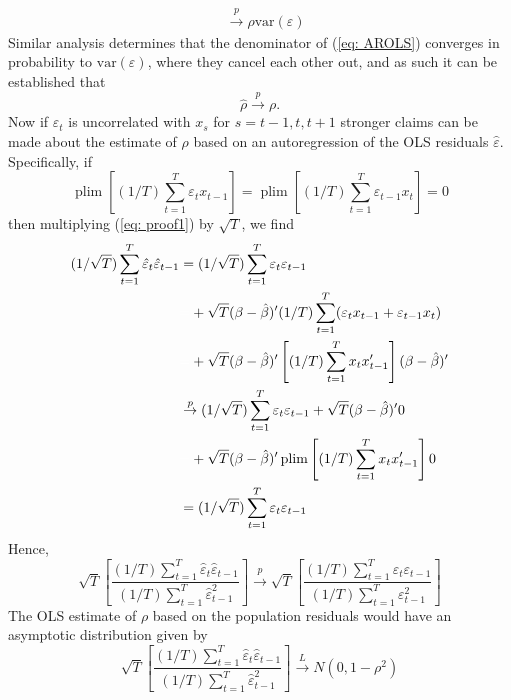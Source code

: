 \documentclass[10pt,handout,english]{beamer}
\DeclareMathOperator*{\plim}{plim}
\begin{document}
\begin{frame}[allowframebreaks]
\begin{align*}
 &\overset{p}{\to}\rho\text{var}(\varepsilon)
\end{align*}
Similar analysis determines that the denominator of (\ref{eq: AROLS}) converges in probability to $\text{var}(\varepsilon)$, where they cancel each other out, and as such it can be established that
\[
\hat{\rho}\overset{p}{\to}\rho.
\]
Now if $\varepsilon_t$ is uncorrelated with $x_s$ for $s=t-1,t,t+1$ stronger claims can be made about the estimate of $\rho$ based on an autoregression of the OLS residuals $\hat{\varepsilon}$. Specifically, if 
\[
\plim\left[(1/T)\sum\limits_{t=1}^{T}\varepsilon_tx_{t-1}\right]=\plim\left[(1/T)\sum\limits_{t=1}^{T}\varepsilon_{t-1}x_{t}\right]=0
\] 
then multiplying (\ref{eq: proof1}) by $\sqrt{T}$, we find
\begingroup
\allowdisplaybreaks
\begin{align}\label{eq: proof2}
\begin{split}
(1/\sqrt{T})\sum\limits_{t=1}^{T}\hat{\varepsilon}_t\hat{\varepsilon}_{t-1}&=(1/\sqrt{T})\sum\limits_{t=1}^{T}\varepsilon_t\varepsilon_{t-1}\\
&\textcolor{white}{=}+\sqrt{T}(\beta-\hat{\beta})'(1/T)\sum\limits_{t=1}^{T}(\varepsilon_tx_{t-1}+\varepsilon_{t-1}x_{t})\\
&\textcolor{white}{=}+\sqrt{T}(\beta-\hat{\beta})'\left[(1/T)\sum\limits_{t=1}^{T}x_tx_{t-1}'\right](\beta-\hat{\beta})'\\
&\overset{p}{\to}(1/\sqrt{T})\sum\limits_{t=1}^{T}\varepsilon_t\varepsilon_{t-1}+\sqrt{T}(\beta-\hat{\beta})'0\\
&\textcolor{white}{=}+\sqrt{T}(\beta-\hat{\beta})'\plim\left[(1/T)\sum\limits_{t=1}^{T}x_tx_{t-1}'\right]0\\
&=(1/\sqrt{T})\sum\limits_{t=1}^{T}\varepsilon_t\varepsilon_{t-1}
\end{split}
\end{align}
\endgroup
Hence,
\[
\sqrt{T}\left[\frac{(1/T)\sum\limits_{t=1}^{T}\hat{\varepsilon}_t\hat{\varepsilon}_{t-1}}{(1/T)\sum\limits_{t=1}^{T}\hat{\varepsilon}_{t-1}^2}\right]\overset{p}{\to}\sqrt{T}\left[\frac{(1/T)\sum\limits_{t=1}^{T}\varepsilon_t\varepsilon_{t-1}}{(1/T)\sum\limits_{t=1}^{T}\varepsilon_{t-1}^2}\right]
\]
The OLS estimate of $\rho$ based on the population residuals would have an asymptotic distribution given by 
\[
\sqrt{T}\left[\frac{(1/T)\sum\limits_{t=1}^{T}\hat{\varepsilon}_t\hat{\varepsilon}_{t-1}}{(1/T)\sum\limits_{t=1}^{T}\hat{\varepsilon}_{t-1}^2}\right]\overset{L}{\to} N(0,1-\rho^2)
\]
\end{frame}
\begin{frame}[allowframebreaks]
%
%
\end{frame}
\end{document}
